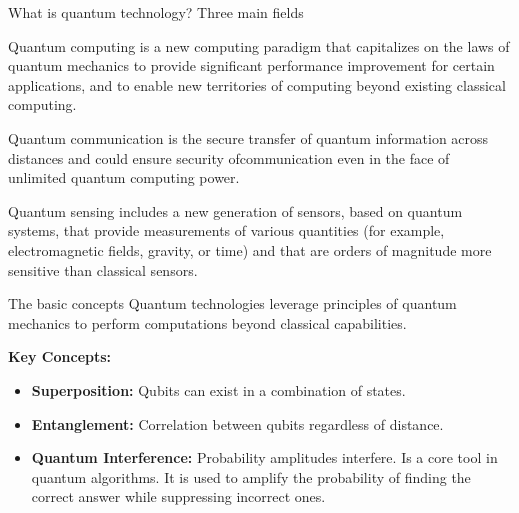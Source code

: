 \documentclass{beamer}
\begin{document}
\begin{frame}{What is quantum technology? Three main fields}
\begin{block}{Quantum computing} is a new computing paradigm that capitalizes on the laws of quantum mechanics to provide significant performance improvement for certain applications, and to enable new territories of computing beyond existing classical
computing.
\end{block}
\begin{block}{Quantum communication} is the secure transfer of quantum information across distances and could ensure security ofcommunication even in the face of unlimited quantum computing power.
\end{block}    
\begin{block}{Quantum sensing} includes a new generation of sensors, based on quantum systems, that provide measurements of various
quantities (for example, electromagnetic fields, gravity, or time) and that are orders of magnitude more sensitive than classical
sensors.
\end{block}
\end{frame}


\begin{frame}{The basic concepts}
Quantum technologies leverage principles of quantum mechanics to perform computations beyond classical capabilities.

\vspace{10pt}
\textbf{Key Concepts:}
\begin{itemize}
\item \textbf{Superposition:} Qubits can exist in a combination of states.
\item \textbf{Entanglement:} Correlation between qubits regardless of distance.
\item \textbf{Quantum Interference:} Probability amplitudes interfere. Is a core tool in quantum algorithms. It is used to amplify the probability of finding the correct answer while suppressing incorrect ones.
\end{itemize}

\end{frame}
\end{document}
